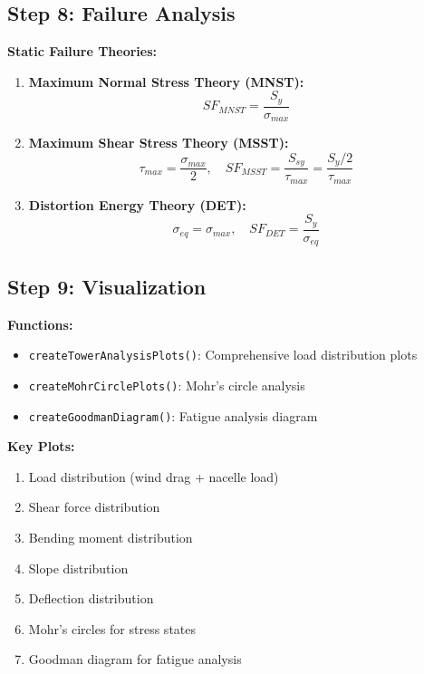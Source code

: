 \documentclass[11pt]{article}
\begin{document}
\subsection{Step 8: Failure Analysis}
\textbf{Static Failure Theories:}
\begin{enumerate}
    \item \textbf{Maximum Normal Stress Theory (MNST):}
    \begin{equation}
    SF_{MNST} = \frac{S_y}{\sigma_{max}}
    \end{equation}
    
    \item \textbf{Maximum Shear Stress Theory (MSST):}
    \begin{equation}
    \tau_{max} = \frac{\sigma_{max}}{2}, \quad SF_{MSST} = \frac{S_{sy}}{\tau_{max}} = \frac{S_y/2}{\tau_{max}}
    \end{equation}
    
    \item \textbf{Distortion Energy Theory (DET):}
    \begin{equation}
    \sigma_{eq} = \sigma_{max}, \quad SF_{DET} = \frac{S_y}{\sigma_{eq}}
    \end{equation}
\end{enumerate}

\subsection{Step 9: Visualization}
\textbf{Functions:}
\begin{itemize}
    \item \texttt{createTowerAnalysisPlots()}: Comprehensive load distribution plots
    \item \texttt{createMohrCirclePlots()}: Mohr's circle analysis
    \item \texttt{createGoodmanDiagram()}: Fatigue analysis diagram
\end{itemize}

\textbf{Key Plots:}
\begin{enumerate}
    \item Load distribution (wind drag + nacelle load)
    \item Shear force distribution
    \item Bending moment distribution
    \item Slope distribution
    \item Deflection distribution
    \item Mohr's circles for stress states
    \item Goodman diagram for fatigue analysis
\end{enumerate}
\end{document}
